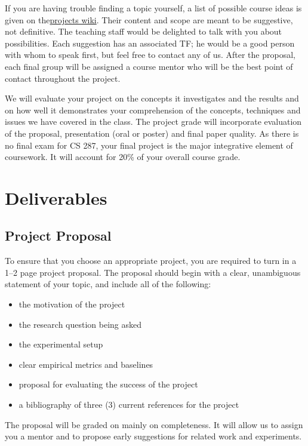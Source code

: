 \documentclass[11pt]{article}
\begin{document}
If you are having trouble finding a topic yourself, a list of possible
course ideas is given on the\href{https://github.com/CS287/Projects/wiki}{projects wiki}. Their
content and scope are meant to be suggestive, not definitive. The
teaching staff would be delighted to talk with you about
possibilities. Each suggestion has an associated TF; he would be a
good person with whom to speak first, but feel free to contact any of
us. After the proposal, each final group will be assigned a course
mentor who will be the best point of contact throughout the project.

We will evaluate your project on the concepts it investigates and the
results and on how well it demonstrates your comprehension of the
concepts, techniques and issues we have covered in the class. The
project grade will incorporate evaluation of the proposal,
presentation (oral or poster) and final paper quality. As there is no
final exam for CS 287, your final project is the major integrative
element of coursework. It will account for 20\% of your overall course
grade.


\section{Deliverables}

\subsection{Project Proposal}

To ensure that you choose an appropriate project, you are required to
turn in a 1--2 page project proposal. The proposal should begin with a
clear, unambiguous statement of your topic, and include all of the
following:

\begin{itemize}
\item the motivation of the project
\item the research question being asked
\item the experimental setup
\item clear empirical metrics and baselines 
\item proposal for evaluating the success of the project

\item a bibliography of three (3) current references for the project   
\end{itemize}

The proposal will be graded on mainly on completeness. It will allow us to assign you a mentor 
and to propose early suggestions for related work and experiments.   
\end{document}
